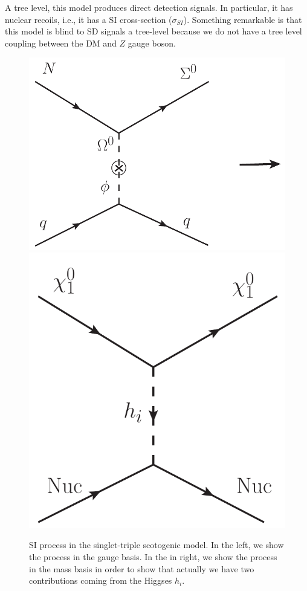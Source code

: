 \documentclass[12pt,letterpaper]{article}
\begin{document}
A tree level, this model produces direct detection signals. In particular, it has nuclear recoils, i.e., it has a SI cross-section ($\sigma_{SI}$). Something remarkable is that this model is blind to SD signals a tree-level because we do not have a tree level coupling between the DM and $Z$ gauge boson. 
\begin{figure}
\begin{center}
\includegraphics[scale=0.37]{SI}
\includegraphics[scale=0.37]{SI-mass-basis}
\caption{SI process in the singlet-triple scotogenic model. In the left, we show the process in the gauge basis. In the in right, we show the process in the mass basis in order to show that actually we have two contributions coming from the Higgses $h_i$.}
\label{fig:SI-diagram}
\end{center}
\end{figure}
\end{document}
